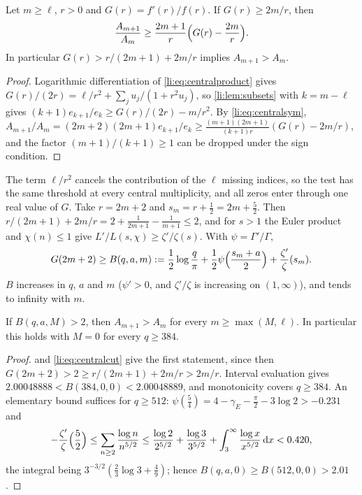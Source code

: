 \begin{theorem}\label{li:thm:ratio}
Let $m\ge\ell$, $r>0$ and $G(r)=f'(r)/f(r)$. If $G(r)\ge2m/r$, then
\[
 \frac{A_{m+1}}{A_m}\ge\frac{2m+1}r\Bigl(G(r)-\frac{2m}r\Bigr).
\]
In particular $G(r)>r/(2m+1)+2m/r$ implies $A_{m+1}>A_m$.
\end{theorem}

\begin{proof}
Logarithmic differentiation of \eqref{li:eq:centralproduct} gives
$G(r)/(2r)=\ell/r^2+\sum_ju_j/(1+r^2u_j)$, so \cref{li:lem:subsets} with $k=m-\ell$ gives
$(k+1)e_{k+1}/e_k\ge G(r)/(2r)-m/r^2$. By \eqref{li:eq:centralsym},
$A_{m+1}/A_m=(2m+2)(2m+1)e_{k+1}/e_k\ge\frac{(m+1)(2m+1)}{(k+1)r}(G(r)-2m/r)$, and the factor
$(m+1)/(k+1)\ge1$ can be dropped under the sign condition.
\end{proof}

The term $\ell/r^2$ cancels the contribution of the $\ell$ missing indices, so the test has the same
threshold at every central multiplicity, and all zeros enter through one real value of $G$. Take
$r=2m+2$ and $s_m=r+\frac12=2m+\frac52$. Then $r/(2m+1)+2m/r=2+\frac1{2m+1}-\frac1{m+1}\le2$, and for
$s>1$ the Euler product and $\chi(n)\le1$ give $L'/L(s,\chi)\ge\zeta'/\zeta(s)$. With $\psi=\Gamma'/\Gamma$,
\begin{equation}\label{li:eq:centralcut}
 G(2m+2)\ge B(q,a,m):=\frac12\log\frac q\pi+\frac12\psi\Bigl(\frac{s_m+a}2\Bigr)+\frac{\zeta'}\zeta(s_m).
\end{equation}
$B$ increases in $q$, $a$ and $m$ ($\psi'>0$, and $\zeta'/\zeta$ is increasing on $(1,\infty)$), and tends to
infinity with $m$.

\begin{corollary}\label{li:cor:centralcut}
If $B(q,a,M)>2$, then $A_{m+1}>A_m$ for every $m\ge\max(M,\ell)$. In particular this holds with $M=0$
for every $q\ge384$.
\end{corollary}

\begin{proof}
 and \eqref{li:eq:centralcut} give the first statement, since then
$G(2m+2)>2\ge r/(2m+1)+2m/r>2m/r$. Interval evaluation gives
$2.00048888<B(384,0,0)<2.00048889$, and monotonicity covers $q\ge384$. An elementary bound suffices for
$q\ge512$: $\psi(\frac54)=4-\gamma_E-\frac\pi2-3\log2>-0.231$ and
\[
 -\frac{\zeta'}\zeta\Bigl(\frac52\Bigr)\le\sum_{n\ge2}\frac{\log n}{n^{5/2}}\le\frac{\log2}{2^{5/2}}+\frac{\log3}{3^{5/2}}
 +\int_3^\infty\frac{\log x}{x^{5/2}}\,\mathrm{d} x<0.420,
\]
the integral being $3^{-3/2}(\frac23\log3+\frac49)$; hence $B(q,a,0)\ge B(512,0,0)>2.01$.
\end{proof}

